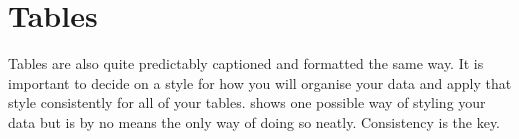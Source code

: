 \section{Tables}
	\label{sec:typesetting_tables}
	
Tables are also quite predictably captioned and formatted the same way.
It is important to decide on a style for how you will organise your data and apply that style consistently for all of your tables.
 shows one possible way of styling your data but is by no means the only way of doing so neatly.
Consistency is the key. 
	
	

